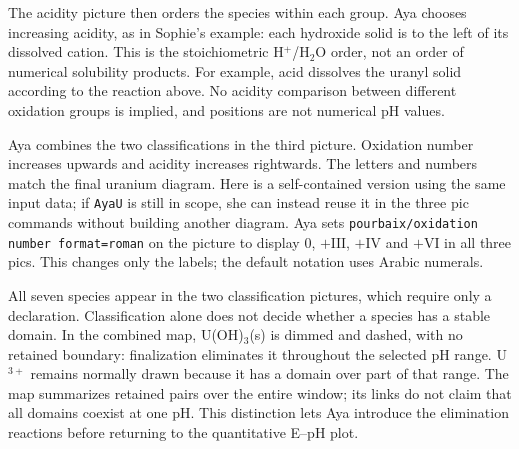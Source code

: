 \documentclass[a4paper,11pt]{ltxdoc}
\begin{document}
The acidity picture then orders the species within each group. Aya chooses
increasing acidity, as in Sophie's example: each hydroxide solid is to the
left of its dissolved cation. This is the stoichiometric H$^+$/H$_2$O order, not an order
of numerical solubility products. For example, acid dissolves the uranyl solid
according to the reaction above. No acidity comparison between different
oxidation groups is implied, and positions are not numerical pH values.

Aya combines the two classifications in the third picture. Oxidation number
increases upwards and acidity increases rightwards. The letters and numbers
match the final uranium diagram. Here is a self-contained version using the same
input data; if \texttt{AyaU} is still in scope, she can instead reuse it in the
three pic commands without building another diagram. Aya sets
\texttt{pourbaix/oxidation number format=roman} on the picture to display
$0$, $+\mathrm{III}$, $+\mathrm{IV}$ and $+\mathrm{VI}$ in all three pics.
This changes only the labels; the default notation uses Arabic numerals.

\begin{codeexample}[width=0pt]
\end{codeexample}

All seven species appear in the two classification pictures, which require
only a declaration. Classification alone does not decide whether a species has
a stable domain. In the combined map, U(OH)$_3$(s) is dimmed and dashed, with no
retained boundary: finalization eliminates it throughout the selected pH range.
U$^{3+}$ remains normally drawn because it has a domain over part of that range.
The map summarizes retained pairs over the entire window; its links do not claim
that all domains coexist at one pH. This distinction lets Aya introduce the
elimination reactions before returning to the quantitative E--pH plot.
\end{document}
